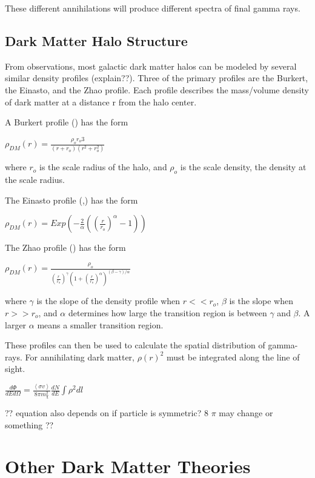 These different annihilations will produce different spectra of final gamma rays.

\subsection{Dark Matter Halo Structure}

From observations, most galactic dark matter halos can be modeled by several similar density profiles (explain??).
Three of the primary profiles are the Burkert, the Einasto, and the Zhao profile.
Each profile describes the mass/volume density of dark matter at a distance r from the halo center.

A Burkert profile (\cite{burkertprofile}) has the form

$ \rho_{DM} \left( r \right) = \frac{ \rho_o r_o3}{ \left( r + r_o \right) \left( r^2 + r_o^2 \right)} $ \label{eqn:burkert}

where $r_o$ is the scale radius of the halo, and $\rho_o$ is the scale density, the density at the scale radius.

The Einasto profile (\cite{einastoprofile1},\cite{einastoprofile2}) has the form

$ \rho_{DM} \left( r \right) = Exp \left( - \frac{2}{\alpha} \left( {\left( \frac{r}{r_o} \right)}^{\alpha} - 1 \right) \right)$ \label{eqn:einasto}

The Zhao profile (\cite{zhaoprofile}) has the form

$ \rho_{DM} \left( r \right) = \frac{\rho_o}{ {\left( \frac{r}{r_o} \right)}^{\gamma} {\left( 1 + {\left( \frac{r}{r_o} \right)}^{\alpha} \right)}^{ \left(\beta - \gamma \right) / \alpha} } $ \label{eqn:zhao}

where $\gamma$ is the slope of the density profile when $r << r_o$, $\beta$ is the slope when $r >> r_o$, and $\alpha$ determines how large the transition region is between $\gamma$ and $\beta$.
A larger $\alpha$ means a smaller transition region.

These profiles can then be used to calculate the spatial distribution of gamma-rays.
For annihilating dark matter, $\rho\left(r\right)^2$ must be integrated along the line of sight.

$ \frac{d\Phi}{dE d\Omega}= \frac{ \left \langle \sigma v \right \rangle }{8 \pi m_\chi^2} \frac{dN}{dE} \int \rho^2 dl $ \label{eqn:dmflux}

?? equation also depends on if particle is symmetric? 8 $\pi$ may change or something ??

\section{Other Dark Matter Theories}

